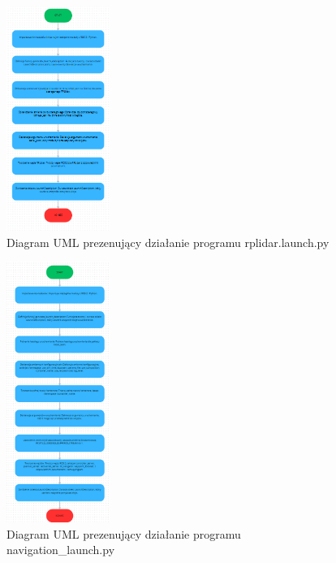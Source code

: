 \documentclass[a4paper,twoside,12pt]{book}
\begin{document}
\begin{figure}[!hb]
	\centering
	\includegraphics[width=0.3\textwidth]{images/uml-lidar.png}
	\caption{Diagram UML prezenujący działanie programu rplidar.launch.py}
	\label{fig:diagram-lidar}
\end{figure}

\begin{figure}[!hb]
	\centering
	\includegraphics[width=0.3\textwidth]{images/uml-nav.png}
	\caption{Diagram UML prezenujący działanie programu navigation\_launch.py}
	\label{fig:diagram-nav}
\end{figure}
\end{document}
